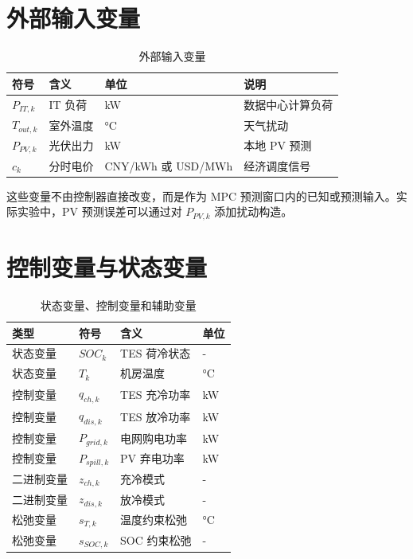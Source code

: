 \documentclass[UTF8,a4paper,12pt]{ctexrep}
\begin{document}
\section{外部输入变量}

\begin{table}[htbp]
  \centering
  \caption{外部输入变量}
  \begin{tabular}{llll}
    \toprule
    符号 & 含义 & 单位 & 说明 \\
    \midrule
    $P_{IT,k}$ & IT 负荷 & kW & 数据中心计算负荷 \\
    $T_{out,k}$ & 室外温度 & \si{\degreeCelsius} & 天气扰动 \\
    $P_{PV,k}$ & 光伏出力 & kW & 本地 PV 预测 \\
    $c_k$ & 分时电价 & CNY/kWh 或 USD/MWh & 经济调度信号 \\
    \bottomrule
  \end{tabular}
\end{table}

这些变量不由控制器直接改变，而是作为 MPC 预测窗口内的已知或预测输入。实际实验中，PV 预测误差可以通过对 $P_{PV,k}$ 添加扰动构造。

\section{控制变量与状态变量}

\begin{table}[htbp]
  \centering
  \caption{状态变量、控制变量和辅助变量}
  \begin{tabular}{llll}
    \toprule
    类型 & 符号 & 含义 & 单位 \\
    \midrule
    状态变量 & $SOC_k$ & TES 荷冷状态 & - \\
    状态变量 & $T_k$ & 机房温度 & \si{\degreeCelsius} \\
    控制变量 & $q_{ch,k}$ & TES 充冷功率 & kW \\
    控制变量 & $q_{dis,k}$ & TES 放冷功率 & kW \\
    控制变量 & $P_{grid,k}$ & 电网购电功率 & kW \\
    控制变量 & $P_{spill,k}$ & PV 弃电功率 & kW \\
    二进制变量 & $z_{ch,k}$ & 充冷模式 & - \\
    二进制变量 & $z_{dis,k}$ & 放冷模式 & - \\
    松弛变量 & $s_{T,k}$ & 温度约束松弛 & \si{\degreeCelsius} \\
    松弛变量 & $s_{SOC,k}$ & SOC 约束松弛 & - \\
    \bottomrule
  \end{tabular}
\end{table}
\end{document}
